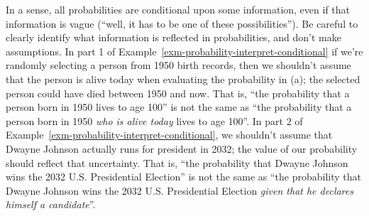 \documentclass[
  letterpaper,
  DIV=11,
  numbers=noendperiod]{scrreprt}
\theoremstyle{plain}
\theoremstyle{definition}
\theoremstyle{definition}
\theoremstyle{definition}
\theoremstyle{remark}
\begin{document}
In a sense, all probabilities are conditional upon some information,
even if that information is vague (``well, it has to be one of these
possibilities''). Be careful to clearly identify what information is
reflected in probabilities, and don't make assumptions. In part 1 of
Example~\ref{exm-probability-interpret-conditional} if we're randomly
selecting a person from 1950 birth records, then we shouldn't assume
that the person is alive today when evaluating the probability in (a);
the selected person could have died between 1950 and now. That is, ``the
probability that a person born in 1950 lives to age 100'' is not the
same as ``the probability that a person born in 1950 \emph{who is alive
today} lives to age 100''. In part 2 of
Example~\ref{exm-probability-interpret-conditional}, we shouldn't assume
that Dwayne Johnson actually runs for president in 2032; the value of
our probability should reflect that uncertainty. That is, ``the
probability that Dwayne Johnson wins the 2032 U.S. Presidential
Election'' is not the same as ``the probability that Dwayne Johnson wins
the 2032 U.S. Presidential Election \emph{given that he declares himself
a candidate}''.
\end{document}
